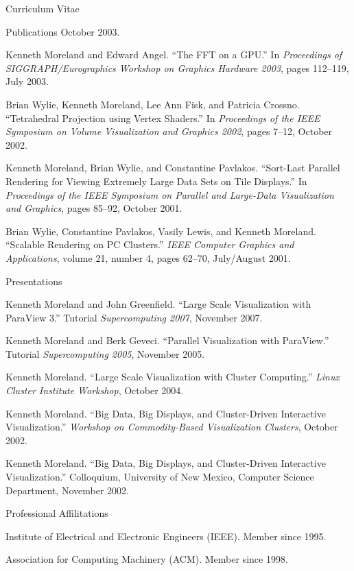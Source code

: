 \documentclass{article}
\begin{document}
\begin{cv}{Curriculum Vitae}
\begin{cvlist}{Publications}
      October 2003.
    \item Kenneth Moreland and Edward Angel.  ``The FFT on a GPU.''  In
      \emph{Proceedings of SIGGRAPH/Eurographics Workshop on Graphics
      Hardware 2003}, pages 112--119, July 2003.
    \item Brian Wylie, Kenneth Moreland, Lee Ann Fisk, and Patricia
      Crossno.  ``Tetrahedral Projection using Vertex Shaders.''  In
      \emph{Proceedings of the IEEE Symposium on Volume Visualization and
      Graphics 2002}, pages 7--12, October 2002.
    \item Kenneth Moreland, Brian Wylie, and Constantine Pavlakos.
      ``Sort-Last Parallel Rendering for Viewing Extremely Large Data
      Sets on Tile Displays.''  In \emph{Proceedings of the IEEE
      Symposium on Parallel and Large-Data Visualization and Graphics},
      pages 85--92, October 2001.
    \item Brian Wylie, Constantine Pavlakos, Vasily Lewis, and Kenneth
      Moreland.  ``Scalable Rendering on PC Clusters.''  \emph{IEEE
      Computer Graphics and Applications}, volume 21, number 4, pages
      62--70, July/August 2001.
    \end{cvlist}

    \begin{cvlist}{Presentations}
    \item Kenneth Moreland and John Greenfield.  ``Large Scale
      Visualization with ParaView 3.''  Tutorial \emph{Supercomputing
      2007}, November 2007.
    \item Kenneth Moreland and Berk Geveci.  ``Parallel Visualization
      with ParaView.''  Tutorial \emph{Supercomputing 2005}, November
      2005.
    \item Kenneth Moreland.  ``Large Scale Visualization with Cluster
      Computing.''  \emph{Linux Cluster Institute Workshop}, October
      2004.
    \item Kenneth Moreland.  ``Big Data, Big Displays, and Cluster-Driven
      Interactive Visualization.''  \emph{Workshop on Commodity-Based
      Visualization Clusters}, October 2002.
    \item Kenneth Moreland.  ``Big Data, Big Displays, and Cluster-Driven
      Interactive Visualization.''  Colloquium, University of New Mexico,
      Computer Science Department, November 2002.
    \end{cvlist}

    \begin{cvlist}{Professional Affilitations}
    \item Institute of Electrical and Electronic Engineers (IEEE).
      Member since 1995.
    \item Association for Computing Machinery (ACM).  Member since 1998.
    \end{cvlist}

  \end{cv}
\end{document}
